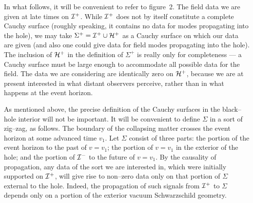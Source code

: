\vfill\eject

\bigskip\bigskip
\epsfxsize=4.9in
\centerline{}
\bigskip

In what follows, it will be convenient to refer to figure~2.  The
field data we are given at late times on ${\cal I} ^+$.  While ${\cal I} ^+$
does not by itself constitute a complete Cauchy surface (roughly
speaking, it contains no data for modes propagating into the hole),
we may take $\Sigma ^+ ={\cal I} ^+ \cup {\cal H}^+$ as a Cauchy surface
on which our data are given (and also one could give data for field
modes propagating into the hole).
The inclusion  of ${\cal H}^+$ in the definition of $\Sigma ^+$ is
really only for completeness --- a Cauchy surface must be large enough
to accommodate all possible data for the field.
The data we are considering are identically zero on ${\cal H}^+$,
because we are at present interested in what distant observers
perceive, rather than in what happens at the event horizon.  

As mentioned above, the precise definition of the Cauchy surfaces in the
black--hole interior will not be important.  It will be convenient to define
$\Sigma$ in a sort of zig--zag, as follows.  The boundary of the collapsing
matter crosses the event horizon at some advanced time $v_1$.  Let $\Sigma$
consist of three parts:  the portion of the event horizon to the past of
$v=v_1$; the portion of $v=v_1$ in the exterior of the hole; and the portion of
${\cal I} ^-$ to the future of $v=v_1$.
By the causality
of propagation, any data of the sort we are interested in, which were
initially supported on ${\cal I} ^+$, will give rise to non--zero data
only on that portion of $\Sigma$ external to the hole.  Indeed, the
propagation of such signals from ${\cal I} ^+$ to $\Sigma$ depends only
on a portion of the exterior vacuum Schwarzschild geometry.
\xdef\sigsec{\the\secno{}.\the\subno}%

